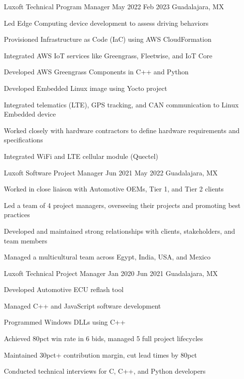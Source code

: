 \documentclass{resume} %
\begin{document}
\job
    {Luxoft}
    {Technical Program Manager}
    {May 2022}
    {Feb 2023}
    {Guadalajara, MX}
    {
    \begin{itemize-bullets}
    \item{Led Edge Computing device development to assess driving behaviors}
    \item{Provisioned Infrastructure as Code (IaC) using AWS CloudFormation}
    \item{Integrated AWS IoT services like Greengrass, Fleetwise, and IoT Core}
    \item{Developed AWS Greengrass Components in C++ and Python}
    \item{Developed Embedded Linux image using Yocto project}
    \item{Integrated telematics (LTE), GPS tracking, and CAN communication to Linux Embedded device}
    \item{Worked closely with hardware contractors to define hardware requirements and specifications}
    \item{Integrated WiFi and LTE cellular module (Quectel)}
    \end{itemize-bullets}
    }


\job
    {Luxoft}
    {Software Project Manager}
    {Jun 2021}
    {May 2022}
    {Guadalajara, MX}
    {
    \begin{itemize-bullets}
    \item{Worked in close liaison with Automotive OEMs, Tier 1, and Tier 2 clients}
    \item{Led a team of 4 project managers, overseeing their projects and promoting best practices}
    \item{Developed and maintained strong relationships with clients, stakeholders, and team members}
    \item{Managed a multicultural team across Egypt, India, USA, and Mexico}
    \end{itemize-bullets}
    }


\job
    {Luxoft}
    {Technical Project Manager}
    {Jan 2020}
    {Jun 2021}
    {Guadalajara, MX}
    {
    \begin{itemize-bullets}
    \item{Developed Automotive ECU reflash tool}
    \item{Managed C++ and JavaScript software development}
    \item{Programmed Windows DLLs using C++}
    \item{Achieved 80pct win rate in 6 bids, managed 5 full project lifecycles}
    \item{Maintained 30pct+ contribution margin, cut lead times by 80pct}
    \item{Conducted technical interviews for C, C++, and Python developers}
    \end{itemize-bullets}
    }
\end{document}
